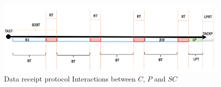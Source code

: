 \documentclass[letterpaper, 10 pt, conference]{ieeeconf}  %
\newcommand{\mycomment}[2]{\hl{#1} {{\leavevmode\smaller\color{red}\itshape\{#2\}}}}
\newcommand{\anote}[1]{{\leavevmode\smaller\itshape\color{red}\{#1\}}}
\newcommand{\smartc}{\ensuremath{\mathit{SC}}}
\begin{document}
\begin{figure}
	\caption{Data receipt protocol Interactions between $C$, $P$ and \smartc{}}
	\label{fig:batching}
	\includegraphics[width=.7\textwidth]{Dis}
	\centering
\end{figure}






%
%



%
%	
%
% 
%
\end{document}
